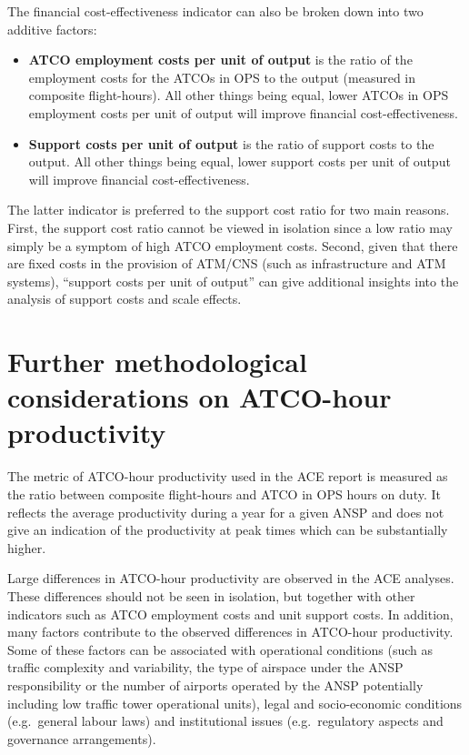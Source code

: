 \documentclass[
  11pt,
  a4paperpaper,
  openany,headsepline=on,footsepline=off,DIV=12,table]{scrbook}
\begin{document}
The financial cost-effectiveness indicator can also be broken down into
two additive factors:

\begin{itemize}
\item
  \textbf{ATCO employment costs per unit of output} is the ratio of the
  employment costs for the ATCOs in OPS to the output (measured in
  composite flight-hours). All other things being equal, lower ATCOs in
  OPS employment costs per unit of output will improve financial
  cost-effectiveness.
\item
  \textbf{Support costs per unit of output} is the ratio of support
  costs to the output. All other things being equal, lower support costs
  per unit of output will improve financial cost-effectiveness.
\end{itemize}

The latter indicator is preferred to the support cost ratio for two main
reasons. First, the support cost ratio cannot be viewed in isolation
since a low ratio may simply be a symptom of high ATCO employment costs.
Second, given that there are fixed costs in the provision of ATM/CNS
(such as infrastructure and ATM systems), ``support costs per unit of
output'' can give additional insights into the analysis of support costs
and scale effects.

\section{Further methodological considerations on ATCO-hour
productivity}\label{further-methodological-considerations-on-atco-hour-productivity}

The metric of ATCO-hour productivity used in the ACE report is measured
as the ratio between composite flight-hours and ATCO in OPS hours on
duty. It reflects the average productivity during a year for a given
ANSP and does not give an indication of the productivity at peak times
which can be substantially higher.

Large differences in ATCO-hour productivity are observed in the ACE
analyses. These differences should not be seen in isolation, but
together with other indicators such as ATCO employment costs and unit
support costs. In addition, many factors contribute to the observed
differences in ATCO-hour productivity. Some of these factors can be
associated with operational conditions (such as traffic complexity and
variability, the type of airspace under the ANSP responsibility or the
number of airports operated by the ANSP potentially including low
traffic tower operational units), legal and socio-economic conditions
(e.g.~general labour laws) and institutional issues (e.g.~regulatory
aspects and governance arrangements).
\end{document}
